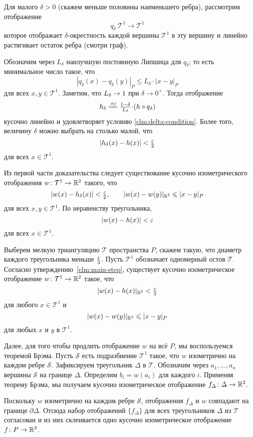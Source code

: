 Для малого $\delta > 0$ (скажем меньше половины наименьшего ребра), 
рассмотрим отображение
$$q_\delta\:\mathcal{T}^1\to\mathcal{T}^1$$ 
которое отображает $\delta$-окрестность каждой вершины  $\mathcal{T}^1$ в эту вершину и линейно растягивает остаток ребра
(смотри граф).

Обозначим через $L_\delta$ наилучшую постоянную Липшица для $q_\delta$;
то есть минимальное число такое, что 
\[|q_\delta(x)-q_\delta(y)|_P\le L_\delta\cdot|x-y|_P\] 
для всех $x,y \in \mathcal{T}^1$.
Заметим, что $L_\delta\z\to 1$ при $\delta\to 0^+$.
Тогда отображение
\[h_\delta
\df
\tfrac{1-\delta}{L_\delta}\cdot (h\circ q_\delta)\]
кусочно линейно и удовлетворяет условию \ref{clm:delta-condition}.
Более того, величину $\delta$ можно выбрать на столько малой, что
\[|h_\delta(x) - h(x)| < \tfrac{\varepsilon}{2}\] 
для всех $x \in \mathcal{T}^1$.

Из первой части доказательства следует существование кусочно изометрического отображения
$w\colon \mathcal{T}^1 \to \mathbb{R}^2$ такого, что
$$|w(x) - h_\delta(x)| < \tfrac{\varepsilon}{2}, \qquad |w(x) - w(y)|_{\mathbb{R}^2} \leqslant |x - y|_P$$
для всех $x, y \in \mathcal{T}^1$.  
По неравенству треугольника,
$$|w(x) - h(x)| < \varepsilon$$ для всех $x \in \mathcal{T}^1$.
\qeds

Выберем мелкую триангуляцию $\mathcal{T}$
пространства $P$,
скажем такую, что диаметр каждого треугольника меньше $\tfrac{\varepsilon}{3}$.
Пусть $\mathcal{T}^1$ обозначает одномерный остов $\mathcal{T}$.
Согласно утверждению~\ref{clm:main-step}, 
существует кусочно изометрическое отображение $w\colon\mathcal{T}^1\to\mathbb{R}^2$ такое, что
$$|w(x)-h(x)|_{\mathbb{R}^2} < \tfrac{\varepsilon}{3}$$
для любого $x\in \mathcal{T}^1$ и
$$|w(x)-w(y)|_{\mathbb{R}^2}\leqslant|x-y|_P$$
для любых $x$ и $y$ в $\mathcal{T}^1$.

Далее, для того чтобы продлить отображение $w$
на всё $P$,
мы воспользуемся теоремой Брэма.
Пусть $\mathcal{S}$ есть подразбиение $\mathcal{T}^1$
такое, что $w$ изометрично на каждом ребре $\mathcal{S}$.
Зафиксируем треугольник $\Delta$ в $\mathcal{T}$.
Обозначим через $a_1,\dots, a_n$ вершины $\mathcal{S}$ 
на границе $\Delta$.
Определим $b_i=w(a_i)$ для каждого $i$.
Применяя теорему Брэма,
мы получаем кусочно изометрическое отображение  $f_\Delta\colon \Delta \to \mathbb{R}^2$.

Поскольку $w$ изометрично на каждом ребре $\mathcal{S}$,
отображения $f_\Delta$ и $w$ совпадают на границе $\partial\Delta$.  
Отсюда набор отображений $\{f_\Delta\}$ для всех треугольников $\Delta$  из $\mathcal{T}$ согласован и из них
склеивается одно кусочно изометрическое отображение $f\colon P\to\mathbb{R}^2$.

